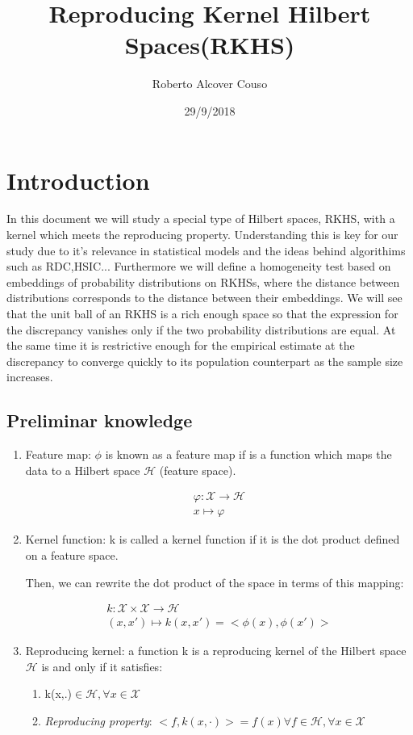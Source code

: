 \documentclass[8pt,a4paper]{article}
\begin{document}
\title{Reproducing Kernel Hilbert Spaces(RKHS)}
\author{Roberto Alcover Couso}
\date{29/9/2018}
\begin{titlepage}
\maketitle
\end{titlepage}
\section{Introduction}
In this document we will study a special type of Hilbert spaces, RKHS, with a kernel which meets the reproducing property. Understanding this is key for our study due to it's relevance in statistical models and the ideas behind algorithims such as RDC,HSIC...
Furthermore we will define a homogeneity test based on embeddings of probability distributions on RKHSs, where the distance between distributions corresponds to the distance between their embeddings. We will see that the unit ball of an RKHS is a rich enough space so that the expression for the discrepancy vanishes only if the two probability distributions are equal. At the same time it is restrictive enough for the empirical estimate at the discrepancy to converge quickly to its population counterpart as the sample size increases.
\subsection{Preliminar knowledge}

\begin{enumerate}
\item \textsf{Feature map}: $\phi$ is known as a feature map if is a function which maps the data to a Hilbert space $\mathcal{H}$ (feature space).

\begin{align*}
\varphi : \mathcal{X} \rightarrow \mathcal{H} \\
x \mapsto \varphi
\end{align*}
\item \textsf{Kernel function}:
k is called a kernel function if it is the dot product defined on a feature space.

Then, we can rewrite the dot product of the space in terms of this mapping:

\begin{align*}
k: \mathcal{X}\times\mathcal{X} \rightarrow \mathcal{H} \\
(x,x') \mapsto k(x,x')=<\phi(x),\phi(x')>
\end{align*}
\item \textsf{Reproducing kernel}:
a function k is a reproducing kernel of the Hilbert space $\mathcal{H}$ is and only if it satisfies:
\begin{enumerate}
\item k(x,.)$\in \mathcal{H}, \forall x \in \mathcal{X}$
\item \textit{Reproducing property}: $<f,k(x,\cdot)> = f(x) \forall f \in \mathcal{H} , \forall x \in \mathcal{X}$
\end{enumerate}
\end{enumerate}
\end{document}
